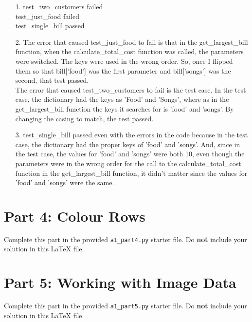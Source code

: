 \documentclass[12pt]{article}
\begin{document}

\begin{enumerate}
\item[1.]
test\_two\_customers failed \\
test\_just\_food failed \\
test\_single\_bill passed


\item[2.]
The error that caused test\_just\_food to fail is that in the get\_largest\_bill function, when the calculate\_total\_cost function was called, the parameters were switched. The keys were used in the wrong order. So, once I flipped them so that bill['food'] was the first parameter and bill['songs'] was the second, that test passed. \\
The error that caused test\_two\_customers to fail is the test case. In the test case, the dictionary had the keys as 'Food' and 'Songs', where as in the get\_largest\_bill function the keys it searches for is 'food' and 'songs'. By changing the casing to match, the test passed.

\item[3.]
test\_single\_bill passed even with the errors in the code because in the test case, the dictionary had the proper keys of 'food' and 'songs'. And, since in the test case, the values for 'food' and 'songs' were both 10, even though the parameters were in the wrong order for the call to the calculate\_total\_cost function in the get\_largest\_bill function, it didn't matter since the values for 'food' and 'songs' were the same.
\end{enumerate}

\section*{Part 4: Colour Rows}

Complete this part in the provided \texttt{a1\_part4.py} starter file.
Do \textbf{not} include your solution in this LaTeX file.

\section*{Part 5: Working with Image Data}

Complete this part in the provided \texttt{a1\_part5.py} starter file.
Do \textbf{not} include your solution in this LaTeX file.
\end{document}
